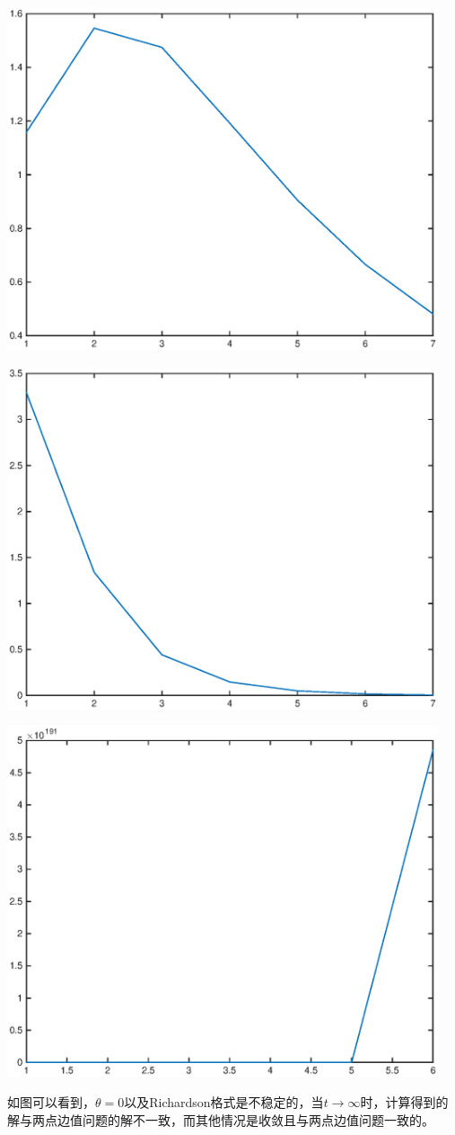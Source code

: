 \documentclass{ctexart}
\begin{document}
\begin{enumerate}
\centerline{\includegraphics[width=5in]{H13_2_11.eps}}

\centerline{\includegraphics[width=5in]{H13_2_55.eps}}

\centerline{\includegraphics[width=5in]{H13_2_66.eps}}

如图可以看到，$\theta=0$以及Richardson格式是不稳定的，当$t \rightarrow \infty$时，计算得到的解与两点边值问题的解不一致，而其他情况是收敛且与两点边值问题一致的。







\end{enumerate}
\end{document}
